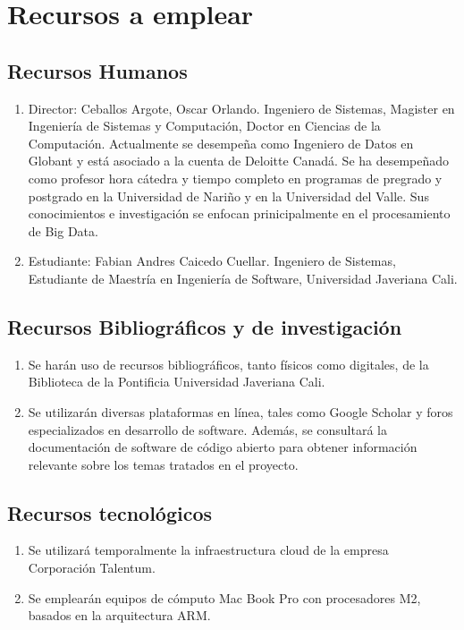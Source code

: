 \section{Recursos a emplear}

\subsection{Recursos Humanos}
\begin{enumerate}
    \item Director: Ceballos Argote, Oscar Orlando. Ingeniero de Sistemas, Magister en Ingenier\'ia de Sistemas y Computaci\'on, Doctor en Ciencias de la Computaci\'on. Actualmente se desempe\~na como Ingeniero de Datos en Globant y est\'a asociado a la cuenta de Deloitte Canad\'a. Se ha desempe\~nado como profesor hora c\'atedra y tiempo completo en programas de pregrado y postgrado en la Universidad de Nari\~no y en la Universidad del Valle. Sus conocimientos e investigaci\'on se enfocan prinicipalmente en el procesamiento de Big Data.
    \item Estudiante: Fabian Andres Caicedo Cuellar. Ingeniero de Sistemas, Estudiante de Maestría en Ingeniería de Software, Universidad Javeriana Cali.
\end{enumerate}

\subsection{Recursos Bibliográficos y de investigación}
\begin{enumerate}
    \item Se harán uso de recursos bibliográficos, tanto físicos como digitales, de la Biblioteca de la Pontificia Universidad Javeriana Cali.

    \item Se utilizarán diversas plataformas en línea, tales como Google Scholar y foros especializados en desarrollo de software. Además, se consultará la documentación de software de código abierto para obtener información relevante sobre los temas tratados en el proyecto.
\end{enumerate}

\subsection{Recursos tecnológicos}
\begin{enumerate}
    \item Se utilizará temporalmente la infraestructura cloud de la empresa Corporación Talentum.
    \item Se emplearán equipos de cómputo Mac Book Pro con procesadores M2, basados en la arquitectura ARM.
\end{enumerate}